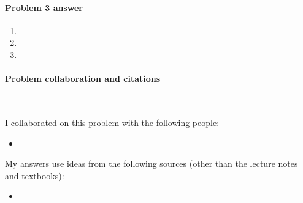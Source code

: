 \paragraph{Problem 3 answer}

\begin{blue}
  
  \begin{enumerate}

  \item[(a)]  %

    \REPLACEME 
    


  \item[(b)]

    \REPLACEME 


  \item[(c)]


    
    \REPLACEME
    
  \end{enumerate}
\end{blue}

\vfill

\paragraph{Problem  collaboration and citations}~

I collaborated on this problem with the following people:
\begin{blue}
  \begin{itemize}
  \item \REPLACEME                    %
  \end{itemize}
\end{blue}

My answers use ideas from the following sources (other than the lecture notes and textbooks): 
\begin{blue}
  \begin{itemize}
  \item \REPLACEME                    %
  \end{itemize}
\end{blue}



